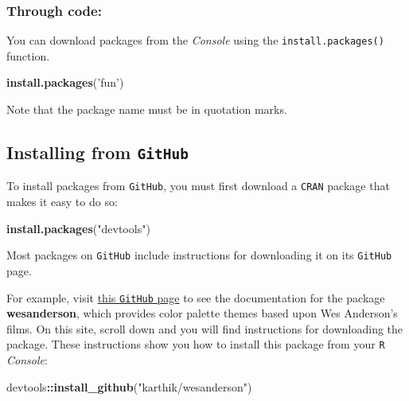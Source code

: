 \documentclass[
]{book}
\newenvironment{Shaded}{\begin{snugshade}}{\end{snugshade}}
\newcommand{\KeywordTok}[1]{\textcolor[rgb]{0.13,0.29,0.53}{\textbf{#1}}}
\newcommand{\NormalTok}[1]{#1}
\newcommand{\OperatorTok}[1]{\textcolor[rgb]{0.81,0.36,0.00}{\textbf{#1}}}
\newcommand{\StringTok}[1]{\textcolor[rgb]{0.31,0.60,0.02}{#1}}
\begin{document}
\hypertarget{through-code}{%
\subsubsection*{Through code:}\label{through-code}}

You can download packages from the \emph{Console} using the \texttt{install.packages()} function.

\begin{Shaded}
\begin{Highlighting}[]
\KeywordTok{install.packages}\NormalTok{(}\StringTok{'fun'}\NormalTok{)}
\end{Highlighting}
\end{Shaded}

Note that the package name must be in quotation marks.

\hypertarget{installing-from-github}{%
\subsection*{\texorpdfstring{Installing from \texttt{GitHub}}{Installing from GitHub}}\label{installing-from-github}}

To install packages from \texttt{GitHub}, you must first download a \texttt{CRAN} package that makes it easy to do so:

\begin{Shaded}
\begin{Highlighting}[]
\KeywordTok{install.packages}\NormalTok{(}\StringTok{"devtools"}\NormalTok{)}
\end{Highlighting}
\end{Shaded}

Most packages on \texttt{GitHub} include instructions for downloading it on its \texttt{GitHub} page.

For example, visit \href{https://github.com/karthik/wesanderson}{this \texttt{GitHub} page} to see the documentation for the package \textbf{wesanderson}, which provides color palette themes based upon Wes Anderson's films. On this site, scroll down and you will find instructions for downloading the package. These instructions show you how to install this package from your \texttt{R} \emph{Console}:

\begin{Shaded}
\begin{Highlighting}[]
\NormalTok{devtools}\OperatorTok{::}\KeywordTok{install_github}\NormalTok{(}\StringTok{"karthik/wesanderson"}\NormalTok{)}
\end{Highlighting}
\end{Shaded}
\end{document}
